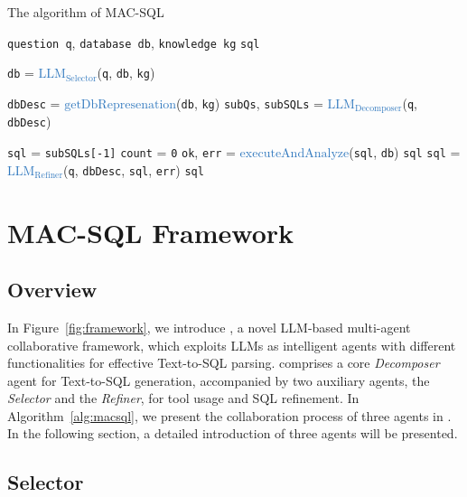 \begin{algorithm}[t]
\caption{The algorithm of MAC-SQL}\label{alg:macsql}
\begin{algorithmic}[1]
\Require \texttt{question q}, \texttt{database db}, \texttt{knowledge kg} 
\Ensure \texttt{sql}

    \State \texttt{db} = \textcolor[HTML]{3078BE}{$\mathrm{LLM_{Selector}}$}(\texttt{q}, \texttt{db}, \texttt{kg})
\EndIf

\State \texttt{dbDesc} = \textcolor[HTML]{3078BE}{$\mathrm{getDbRepresenation}$}(\texttt{db}, \texttt{kg})
\State \texttt{subQs}, \texttt{subSQLs} = \textcolor[HTML]{3078BE}{$\mathrm{LLM_{Decomposer}}$}(\texttt{q}, \texttt{dbDesc})

\State \texttt{sql} = \texttt{subSQLs[-1]}
\State \texttt{count} = \texttt{0}
    \State \texttt{ok}, \texttt{err} = \textcolor[HTML]{3078BE}{$\mathrm{executeAndAnalyze}$}(\texttt{sql}, \texttt{db})
        \State \Return \texttt{sql}
    \Else
        \State \texttt{sql} = \textcolor[HTML]{3078BE}{$\mathrm{LLM_{Refiner}}$}(\texttt{q}, \texttt{dbDesc}, \texttt{sql}, \texttt{err})
    \EndIf
\EndWhile
\State \Return \texttt{sql}

\end{algorithmic}
\end{algorithm}

\section{MAC-SQL Framework}
\label{sec:method}

\subsection{Overview}
\label{sec:overview}
In Figure~\ref{fig:framework}, we introduce \ours{}, a novel LLM-based multi-agent collaborative framework, which exploits LLMs as intelligent agents with different functionalities for effective Text-to-SQL parsing. 
\ours{} comprises a core \textit{Decomposer} agent for Text-to-SQL generation, accompanied by two auxiliary agents, the \textit{Selector} and the \textit{Refiner}, for tool usage and SQL refinement.
In Algorithm~\ref{alg:macsql}, we present the collaboration process of three agents in \ours{}. 
In the following section, a detailed introduction of three agents will be presented.

\subsection{Selector}
\label{sec:selector}


